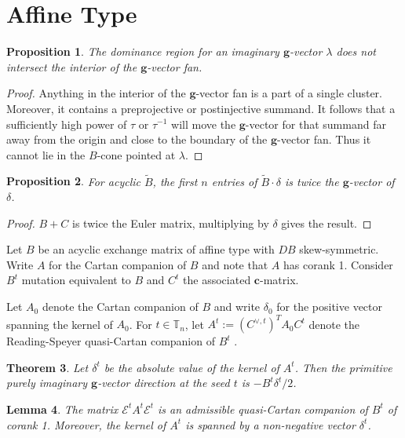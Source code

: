 \documentclass{amsart}
\newtheorem{theorem}{Theorem}
\newtheorem{lemma}[theorem]{Lemma}
\newtheorem{proposition}[theorem]{Proposition}
\numberwithin{theorem}{section}
\newcommand{\bfc}{\boldsymbol{c}}
\newcommand{\bfg}{\boldsymbol{g}}
\newcommand{\cE}{\mathcal{E}}
\newcommand{\TT}{\mathbb{T}}
\begin{document}
  \section{Affine Type}
  
  \begin{proposition}
    The dominance region for an imaginary $\bfg$-vector $\lambda$ does not intersect the interior of the $\bfg$-vector fan.
  \end{proposition}
  \begin{proof}
    Anything in the interior of the $\bfg$-vector fan is a part of a single cluster.
    Moreover, it contains a preprojective or postinjective summand.
    It follows that a sufficiently high power of $\tau$ or $\tau^{-1}$ will move the $\bfg$-vector for that summand far away from the origin and close to the boundary of the $\bfg$-vector fan.
    Thus it cannot lie in the $B$-cone pointed at $\lambda$.
  \end{proof}

  \begin{proposition}
    For acyclic $\tilde B$, the first $n$ entries of $\tilde B\cdot\delta$ is twice the $\bfg$-vector of $\delta$.
  \end{proposition}
  \begin{proof}
    $B+C$ is twice the Euler matrix, multiplying by $\delta$ gives the result.
  \end{proof}


  Let $B$ be an acyclic exchange matrix of affine type with $DB$ skew-symmetric.
  Write $A$ for the Cartan companion of $B$ and note that $A$ has corank 1.
  Consider $B^t$ mutation equivalent to $B$ and $C^t$ the associated $\bfc$-matrix.

  Let $A_0$ denote the Cartan companion of $B$ and write $\delta_0$ for the positive vector spanning the kernel of $A_0$.
  For $t\in\TT_n$, let $A^t:=(C^{\vee,t})^T A_0 C^t$ denote the Reading-Speyer quasi-Cartan companion of $B^t$ \cite[Cor. 3.29]{Combinatorial Frameworks for Cluster Algebras}.
  \begin{theorem}
    Let $\delta^t$ be the absolute value of the kernel of $A^t$.
    Then the primitive purely imaginary $\bfg$-vector direction at the seed $t$ is $-B^t\delta^t/2$.
  \end{theorem}

  \begin{lemma}
    The matrix $\cE^t A^t \cE^t$ is an admissible quasi-Cartan companion of $B^t$ of corank 1.
    Moreover, the kernel of $A^t$ is spanned by a non-negative vector $\delta^t$. 
  \end{lemma}
\end{document}
